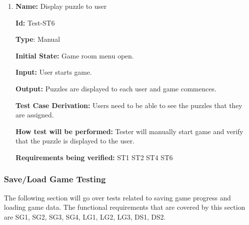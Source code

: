 \documentclass[12pt, titlepage]{article}
\begin{document}
\begin{enumerate}
\item{\textbf{Name:} Display puzzle to user}

\textbf{Id:} Test-ST6

\textbf{Type}: Manual

\textbf{Initial State:} Game room menu open.

\textbf{Input:} User starts game.

\textbf{Output:} Puzzles are displayed to each user and game commences.

\textbf{Test Case Derivation:} Users need to be able to see the puzzles that they are assigned.

\textbf{How test will be performed:} Tester will manually start game and verify that the puzzle is displayed to the user.

\textbf{Requirements being verified: } ST1 ST2 ST4 ST6

\end{enumerate}

\subsubsection{Save/Load Game Testing}
The following section will go over tests related to saving game progress and loading game data. The functional requirements that are covered by this section are SG1, SG2, SG3, SG4, LG1, LG2, LG3, DS1, DS2.
\end{document}
